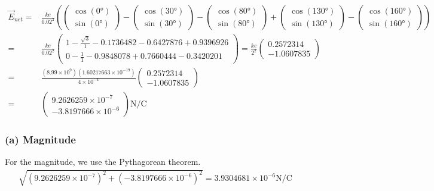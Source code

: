 \documentclass[12pt]{article}
\begin{document}
\begin{align*}
    \vec{E}_{net}   =&  \frac{ke}{0.02^2}\left(\begin{pmatrix}\cos(0\unit{\degree})\\ \sin(0\unit{\degree})\end{pmatrix}
        - \begin{pmatrix}\cos(30\unit{\degree})\\ \sin(30\unit{\degree})\end{pmatrix}
        - \begin{pmatrix}\cos(80\unit{\degree})\\ \sin(80\unit{\degree})\end{pmatrix}
        + \begin{pmatrix}\cos(130\unit{\degree})\\ \sin(130\unit{\degree})\end{pmatrix}
        - \begin{pmatrix}\cos(160\unit{\degree})\\ \sin(160\unit{\degree})\end{pmatrix}\right)\\
        =&  \frac{ke}{0.02^2} \begin{pmatrix}
            1   - \frac{\sqrt{3}}{1}    - 0.1736482 - 0.6427876    + 0.9396926\\
            0   - \frac{1}{1}           - 0.9848078 + 0.7660444    - 0.3420201
        \end{pmatrix}
        =   \frac{ke}{2^2} \begin{pmatrix}
            0.2572314\\
            -1.0607835
        \end{pmatrix}\\
        =&  \frac{(8.99 \times 10^{9})(1.60217663 \times 10^{-19})}{4 \times 10^{-4}}\begin{pmatrix} 0.2572314 \\ -1.0607835\end{pmatrix}\\
        =&  \begin{pmatrix} 9.2626259 \times 10^{-7} \\ -3.8197666 \times 10^{-6} \end{pmatrix} \unit{\newton/\coulomb}
\end{align*}

\subsubsection*{(a) Magnitude}
For the magnitude, we use the Pythagorean theorem.
\begin{align*}
    \sqrt{(9.2626259 \times 10^{-7})^2 + (-3.8197666 \times 10^{-6})^2} = \boxed{3.9304681 \times 10^{-6} \unit{\newton/\coulomb}}
\end{align*}
\end{document}
